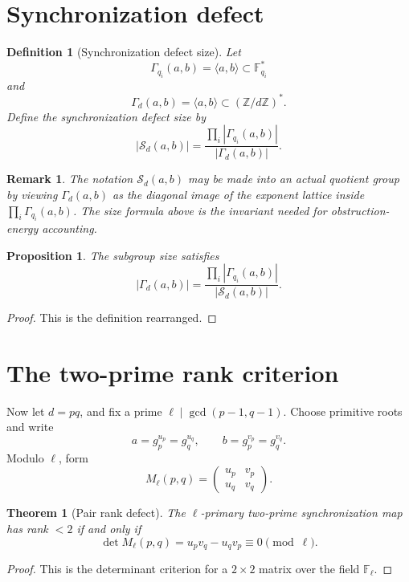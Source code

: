 \documentclass[11pt]{article}
\newtheorem{theorem}{Theorem}
\newtheorem{proposition}{Proposition}
\newtheorem{definition}{Definition}
\newtheorem{remark}{Remark}
\newcommand{\Z}{\mathbb Z}
\newcommand{\F}{\mathbb F}
\newcommand{\1}{\mathbf 1}
\begin{document}
\section{Synchronization defect}

\begin{definition}[Synchronization defect size]
Let
\[
\Gamma_{q_i}(a,b)=\langle a,b\rangle\subset\F_{q_i}^*
\]
and
\[
\Gamma_d(a,b)=\langle a,b\rangle\subset(\Z/d\Z)^*.
\]
Define the synchronization defect size by
\[
|\mathcal S_d(a,b)|
=
\frac{\prod_i|\Gamma_{q_i}(a,b)|}{|\Gamma_d(a,b)|}.
\]
\end{definition}

\begin{remark}
The notation \(\mathcal S_d(a,b)\) may be made into an actual quotient group by viewing \(\Gamma_d(a,b)\) as the diagonal image of the exponent lattice inside \(\prod_i\Gamma_{q_i}(a,b)\).  The size formula above is the invariant needed for obstruction-energy accounting.
\end{remark}

\begin{proposition}
The subgroup size satisfies
\[
|\Gamma_d(a,b)|=
\frac{\prod_i|\Gamma_{q_i}(a,b)|}{|\mathcal S_d(a,b)|}.
\]
\end{proposition}

\begin{proof}
This is the definition rearranged.
\end{proof}

\section{The two-prime rank criterion}

Now let \(d=pq\), and fix a prime \(\ell\mid\gcd(p-1,q-1)\).  Choose primitive roots and write
\[
a=g_p^{u_p}=g_q^{u_q},\qquad b=g_p^{v_p}=g_q^{v_q}.
\]
Modulo \(\ell\), form
\[
M_\ell(p,q)=
\begin{pmatrix}
u_p&v_p\\
u_q&v_q
\end{pmatrix}.
\]

\begin{theorem}[Pair rank defect]\label{T:rank}
The \(\ell\)-primary two-prime synchronization map has rank \(<2\) if and only if
\[
\det M_\ell(p,q)=u_pv_q-u_qv_p\equiv0\pmod\ell.
\]
\end{theorem}

\begin{proof}
This is the determinant criterion for a \(2\times2\) matrix over the field \(\F_\ell\).
\end{proof}
\end{document}
